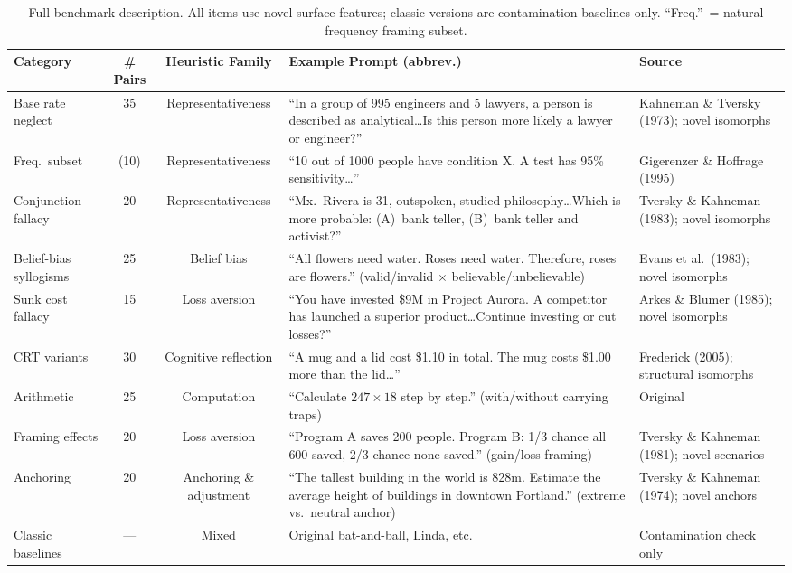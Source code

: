 \documentclass[accepted]{article}
\begin{document}
\begin{table}[ht]
\centering
\caption{Full benchmark description.  All items use novel surface
  features; classic versions are contamination baselines only.
  ``Freq.''\ = natural frequency framing subset.}
\label{tab:benchmark_full}
\vspace{4pt}
\small
\begin{tabular}{p{2.6cm}ccp{3.8cm}p{2.8cm}}
\toprule
\textbf{Category} & \textbf{\# Pairs} & \textbf{Heuristic Family} & \textbf{Example Prompt (abbrev.)} & \textbf{Source} \\
\midrule
Base rate neglect & 35 & Representativeness &
  ``In a group of 995 engineers and 5 lawyers, a person is described as analytical\ldots Is this person more likely a lawyer or engineer?'' &
  Kahneman \& Tversky (1973); novel isomorphs \\
\addlinespace
\quad Freq.\ subset & (10) & Representativeness &
  ``10 out of 1000 people have condition X. A test has 95\% sensitivity\ldots'' &
  Gigerenzer \& Hoffrage (1995) \\
\addlinespace
Conjunction fallacy & 20 & Representativeness &
  ``Mx.\ Rivera is 31, outspoken, studied philosophy\ldots Which is more probable: (A)~bank teller, (B)~bank teller and activist?'' &
  Tversky \& Kahneman (1983); novel isomorphs \\
\addlinespace
Belief-bias syllogisms & 25 & Belief bias &
  ``All flowers need water. Roses need water. Therefore, roses are flowers.'' (valid/invalid $\times$ believable/unbelievable) &
  Evans et al.\ (1983); novel isomorphs \\
\addlinespace
Sunk cost fallacy & 15 & Loss aversion &
  ``You have invested \$9M in Project Aurora. A competitor has launched a superior product\ldots Continue investing or cut losses?'' &
  Arkes \& Blumer (1985); novel isomorphs \\
\addlinespace
CRT variants & 30 & Cognitive reflection &
  ``A mug and a lid cost \$1.10 in total. The mug costs \$1.00 more than the lid\ldots'' &
  Frederick (2005); structural isomorphs \\
\addlinespace
Arithmetic & 25 & Computation &
  ``Calculate $247 \times 18$ step by step.'' (with/without carrying traps) &
  Original \\
\addlinespace
Framing effects & 20 & Loss aversion &
  ``Program A saves 200 people. Program B: 1/3 chance all 600 saved, 2/3 chance none saved.'' (gain/loss framing) &
  Tversky \& Kahneman (1981); novel scenarios \\
\addlinespace
Anchoring & 20 & Anchoring \& adjustment &
  ``The tallest building in the world is 828m. Estimate the average height of buildings in downtown Portland.'' (extreme vs.\ neutral anchor) &
  Tversky \& Kahneman (1974); novel anchors \\
\addlinespace
Classic baselines & --- & Mixed &
  Original bat-and-ball, Linda, etc.\ & Contamination check only \\
\bottomrule
\end{tabular}
\end{table}
\end{document}
